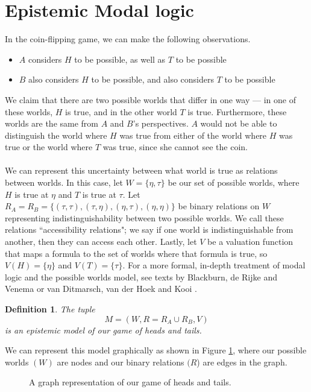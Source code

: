 \documentclass[12pt, a4paper, titlepage]{scrartcl}
\newtheorem{defn}{Definition}
\begin{document}
\section{Epistemic Modal logic}\label{epistemic}
In the coin-flipping game, we can make the following observations.
\begin{itemize}
	\item $A$ considers $H$ to be possible, as well as $T$ to be possible
	\item $B$ also considers $H$ to be possible, and also considers $T$ to be possible
\end{itemize}
We claim that there are two possible worlds that differ in one way ---
in one of these worlds, $H$ is true, and in the other world $T$ is true.
Furthermore, these worlds are the same from $A$ and $B$'s perspectives.
$A$ would not be able to distinguish the world where $H$ was true from either of
the world where $H$ was true or the world where $T$ was true, since she cannot
see the coin.\\
\\
We can represent this uncertainty between what world is true as relations
between worlds.
In this case, let $W = \{ \eta, \tau\}$ be our set of possible worlds, where $H$ is true
at $\eta$ and $T$ is true at $\tau$.
Let $R_A = R_B = \{(\tau,\tau), (\tau,\eta), (\eta, \tau), (\eta,\eta)\}$ be
binary relations on $W$ representing indistinguishability between two possible
worlds.
We call these relations ``accessibility relations"; we say if one world is
indistinguishable from another, then they can access each other.
Lastly, let $V$ be a valuation function that maps a formula to the set of worlds
where that formula is true, so $V(H) = \{\eta\}$ and $V(T) = \{\tau\}$.
For a more formal, in-depth treatment of modal logic and the possible worlds model, see
texts by Blackburn, de Rijke and Venema \cite{blackburn2002modal} or van
Ditmarsch, van der Hoek and Kooi \cite{hoek2008dynamic}.
\begin{defn}
	The tuple
	\[
		M = (W, R = R_A \cup R_B, V)
	\]
	is an epistemic model of our game of heads and tails.
\end{defn}

We can represent this model graphically as shown in Figure \ref{htkripkefigure},
where our possible worlds $(W)$ are nodes and our binary relations $(R$) are edges in the
graph.
\begin{figure}[ht!]
\centering
{}
\caption{A graph representation of our game of heads and tails.}\label{htkripkefigure}
\end{figure}
\end{document}
